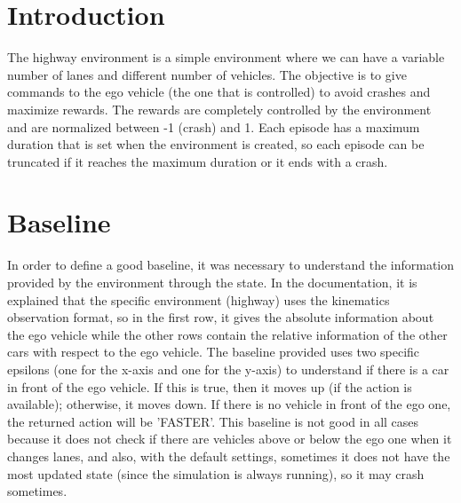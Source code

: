 \documentclass{article}
\begin{document}

\begin{abstract}
This project investigates the possibility of using a reinforcement learning agent to avoid crashes in the given highway environment \cite{highway-env}. This project compares the output of the best RL agent found with a specific baseline and with the human controlling the car. The baseline explained in Section \ref{section:Baseline} is defined in order to be an informed guess of the action that must be taken. To find the best RL agent, three different approaches are investigated: Double Deep Q-Network (DQN), Dueling Deep Q-Network (DQN), and Proximal Policy Optimization (PPO). These 3 approaches are presented in Section \ref{section:Approaches}.
\end{abstract}

\section{Introduction} \label{section:Introduction}
The highway environment \cite{highway-env} is a simple environment where we can have a variable number of lanes and different number of vehicles. The objective is to give commands to the ego vehicle (the one that is controlled) to avoid crashes and maximize rewards. The rewards are completely controlled by the environment and are normalized between -1 (crash) and 1. Each episode has a maximum duration that is set when the environment is created, so each episode can be truncated if it reaches the maximum duration or it ends with a crash.

\section{Baseline}\label{section:Baseline}
In order to define a good baseline, it was necessary to understand the information provided by the environment \cite{highway-env} through the state. In the documentation, it is explained that the specific environment (highway) uses the kinematics observation format, so in the first row, it gives the absolute information about the ego vehicle while the other rows contain the relative information of the other cars with respect to the ego vehicle.
The baseline provided uses two specific epsilons (one for the x-axis and one for the y-axis) to understand if there is a car in front of the ego vehicle. If this is true, then it moves up (if the action is available); otherwise, it moves down. If there is no vehicle in front of the ego one, the returned action will be 'FASTER'.
This baseline is not good in all cases because it does not check if there are vehicles above or below the ego one when it changes lanes, and also, with the default settings, sometimes it does not have the most updated state (since the simulation is always running), so it may crash sometimes.
\end{document}
